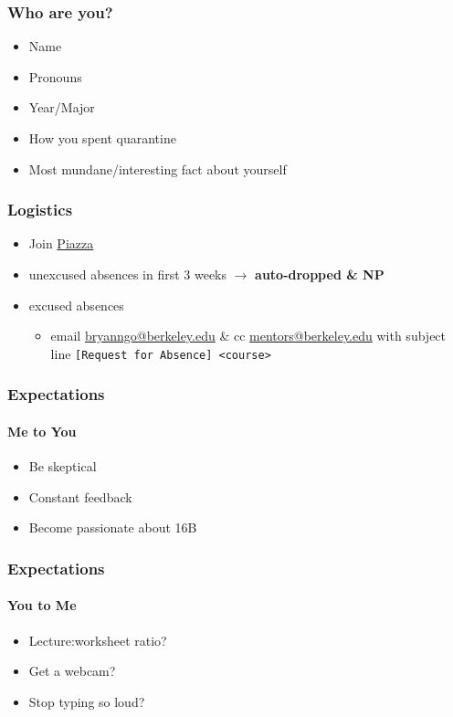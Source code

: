 \documentclass[aspectratio=169]{beamer}
\begin{document}
\begin{frame}
    \frametitle{Who are you?}

    \begin{itemize}
        \item Name
        \item Pronouns
        \item Year/Major
        \item How you spent quarantine
        \item Most mundane/interesting fact about yourself
    \end{itemize}
\end{frame}

\begin{frame}
    \frametitle{Logistics}

    \begin{itemize}
        \item Join \href{http://piazza.com/berkeley/fall2020/csm16b}{Piazza}
        \item unexcused absences in first 3 weeks \(\to\) \textbf{auto-dropped \& NP}
        \item excused absences
        \begin{itemize}
            \item email \href{mailto:bryanngo@berkeley.edu}{bryanngo@berkeley.edu} \& cc \href{mailto:mentors@berkeley.edu}{mentors@berkeley.edu} with subject line \texttt{[Request for Absence] <course>}
        \end{itemize}
    \end{itemize}
\end{frame}

\begin{frame}
    \frametitle{Expectations}
    \framesubtitle{Me to You}

    \begin{itemize}
        \item Be skeptical
        \item Constant feedback
        \item Become passionate about 16B
    \end{itemize}
\end{frame}

\begin{frame}
    \frametitle{Expectations}
    \framesubtitle{You to Me}

    \begin{itemize}
        \item Lecture:worksheet ratio?
        \item Get a webcam?
        \item Stop typing so loud?
    \end{itemize}
\end{frame}
\end{document}
